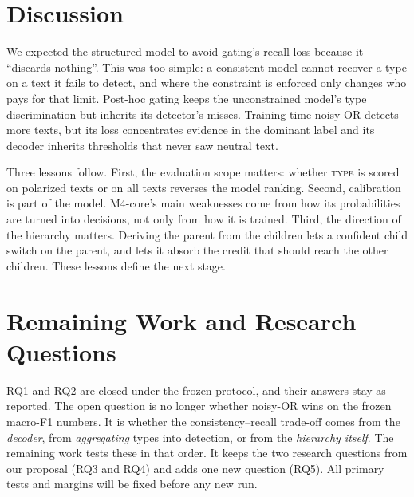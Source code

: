 \documentclass[11pt]{article}
\newcommand{\TYPE}{\textsc{type}}
\begin{document}
\section{Discussion}
\label{sec:discussion}

We expected the structured model to avoid gating's recall loss because it
``discards nothing''. This was too simple: a consistent model cannot recover a
type on a text it fails to detect, and where the constraint is enforced only
changes who pays for that limit. Post-hoc gating keeps the unconstrained model's type discrimination but
inherits its detector's misses. Training-time noisy-OR detects more texts,
but its loss concentrates evidence in the dominant label and its decoder
inherits thresholds that never saw neutral text.

Three lessons follow. First, the evaluation scope matters: whether \TYPE{}
is scored on polarized texts or on all texts reverses the model ranking.
Second, calibration is part of the model. M4-core's main weaknesses come
from how its probabilities are turned into decisions, not only from how it
is trained. Third, the direction of the hierarchy matters. Deriving the
parent from the children lets a confident child switch on the parent, and
lets it absorb the credit that should reach the other children. These
lessons define the next stage.

\section{Remaining Work and Research Questions}
\label{sec:future}

RQ1 and RQ2 are closed under the frozen protocol, and their answers stay as
reported. The open question is no longer whether noisy-OR wins on the frozen
macro-F1 numbers. It is whether the consistency--recall trade-off comes from
the \emph{decoder}, from \emph{aggregating} types into detection, or from the
\emph{hierarchy itself}. The remaining work tests these in that order. It
keeps the two research questions from our proposal (RQ3 and RQ4) and adds
one new question (RQ5). All primary tests and margins will be fixed before
any new run.
\end{document}
